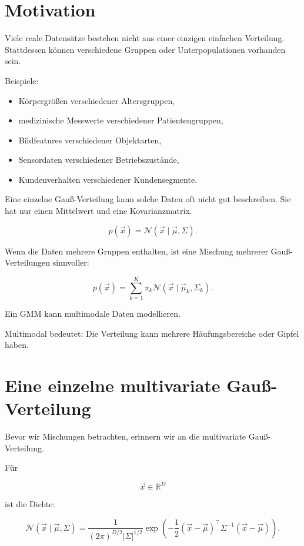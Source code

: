 \section{Motivation}

Viele reale Datensätze bestehen nicht aus einer einzigen einfachen Verteilung.
Stattdessen können verschiedene Gruppen oder Unterpopulationen vorhanden sein.

Beispiele:

\begin{itemize}
    \item Körpergrößen verschiedener Altersgruppen,
    \item medizinische Messwerte verschiedener Patientengruppen,
    \item Bildfeatures verschiedener Objektarten,
    \item Sensordaten verschiedener Betriebszustände,
    \item Kundenverhalten verschiedener Kundensegmente.
\end{itemize}

Eine einzelne Gauß-Verteilung kann solche Daten oft nicht gut beschreiben.
Sie hat nur einen Mittelwert und eine Kovarianzmatrix.

\[
    p(\vec{x})
    =
    \mathcal{N}(\vec{x}\mid\vec{\mu},\Sigma).
\]

Wenn die Daten mehrere Gruppen enthalten, ist eine Mischung mehrerer Gauß-Verteilungen sinnvoller:

\[
    p(\vec{x})
    =
    \sum_{k=1}^{K}
    \pi_k
    \mathcal{N}(\vec{x}\mid\vec{\mu}_k,\Sigma_k).
\]

\begin{conceptbox}
Ein GMM kann multimodale Daten modellieren.

Multimodal bedeutet:
Die Verteilung kann mehrere Häufungsbereiche oder Gipfel haben.
\end{conceptbox}

\section{Eine einzelne multivariate Gauß-Verteilung}

Bevor wir Mischungen betrachten, erinnern wir an die multivariate Gauß-Verteilung.

Für

\[
    \vec{x}\in\mathbb{R}^D
\]

ist die Dichte:

\[
    \mathcal{N}(\vec{x}\mid\vec{\mu},\Sigma)
    =
    \frac{1}{(2\pi)^{D/2}|\Sigma|^{1/2}}
    \exp
    \left(
        -\frac{1}{2}
        (\vec{x}-\vec{\mu})^{\top}
        \Sigma^{-1}
        (\vec{x}-\vec{\mu})
    \right).
\]

